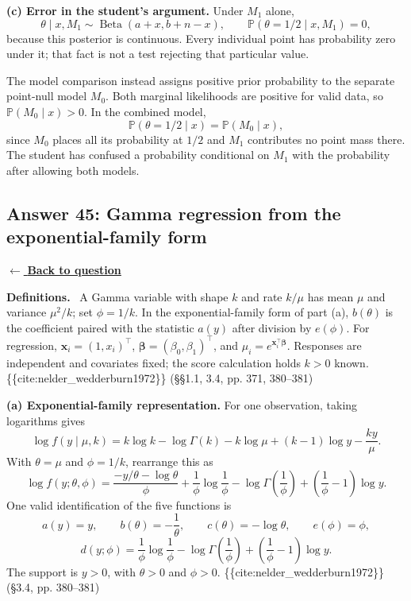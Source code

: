\documentclass[11pt,a4paper]{article}
\newcommand{\given}{\mathrel{|}}
\newcommand{\answernav}[1]{%
  \label{answer:#1}%
  \noindent\hyperref[question:#1]{$\leftarrow$ \textbf{Back to question}}%
  \par\smallskip}
\newcommand{\studyheading}[1]{%
  \par\medskip\noindent\textcolor{statblue}{\textbf{#1.}}\ }
\begin{document}
\textbf{(c) Error in the student's argument.}
Under $M_1$ alone,
\[
\theta\given x,M_1\sim\operatorname{Beta}(a+x,b+n-x),
\qquad \mathbb{P}(\theta=1/2\given x,M_1)=0,
\]
because this posterior is continuous. Every individual point has probability
zero under it; that fact is not a test rejecting that particular value.

The model comparison instead assigns positive prior probability to the
separate point-null model $M_0$. Both marginal likelihoods are positive for
valid data, so $\mathbb{P}(M_0\given x)>0$. In the combined model,
\[
\mathbb{P}(\theta=1/2\given x)=\mathbb{P}(M_0\given x),
\]
since $M_0$ places all its probability at $1/2$ and $M_1$ contributes no
point mass there. The student has confused a probability conditional on
$M_1$ with the probability after allowing both models.

\clearpage

\subsection{Answer 45: Gamma regression from the exponential-family form}
\answernav{45}

\studyheading{Definitions}
A Gamma variable with shape $k$ and rate $k/\mu$ has mean $\mu$ and variance $\mu^2/k$; set $\phi=1/k$.
In the exponential-family form of part (a), $b(\theta)$ is the coefficient paired with the statistic $a(y)$ after division by $e(\phi)$.
For regression, $\mathbf x_i=(1,x_i)^\top$, $\boldsymbol\beta=(\beta_0,\beta_1)^\top$, and $\mu_i=e^{\mathbf x_i^\top\boldsymbol\beta}$.
Responses are independent and covariates fixed; the score calculation holds $k>0$ known.
\{\{cite:nelder_wedderburn1972\}\} (§§1.1, 3.4, pp. 371, 380–381)

\textbf{(a) Exponential-family representation.}
For one observation, taking logarithms gives
\[
\log f(y\given\mu,k)
=k\log k-\log\Gamma(k)-k\log\mu+(k-1)\log y-\frac{ky}{\mu}.
\]
With $\theta=\mu$ and $\phi=1/k$, rearrange this as
\[
\log f(y;\theta,\phi)
=\frac{-y/\theta-\log\theta}{\phi}
+\frac1\phi\log\frac1\phi-\log\Gamma\!\left(\frac1\phi\right)
+\left(\frac1\phi-1\right)\log y.
\]
One valid identification of the five functions is
\[
\boxed{
a(y)=y,\qquad b(\theta)=-\frac1\theta,\qquad
c(\theta)=-\log\theta,\qquad e(\phi)=\phi,
}
\]
\[
\boxed{
d(y;\phi)=\frac1\phi\log\frac1\phi
-\log\Gamma\!\left(\frac1\phi\right)
+\left(\frac1\phi-1\right)\log y.
}
\]
The support is $y>0$, with $\theta>0$ and $\phi>0$.
\{\{cite:nelder_wedderburn1972\}\} (§3.4, pp. 380–381)
\end{document}
